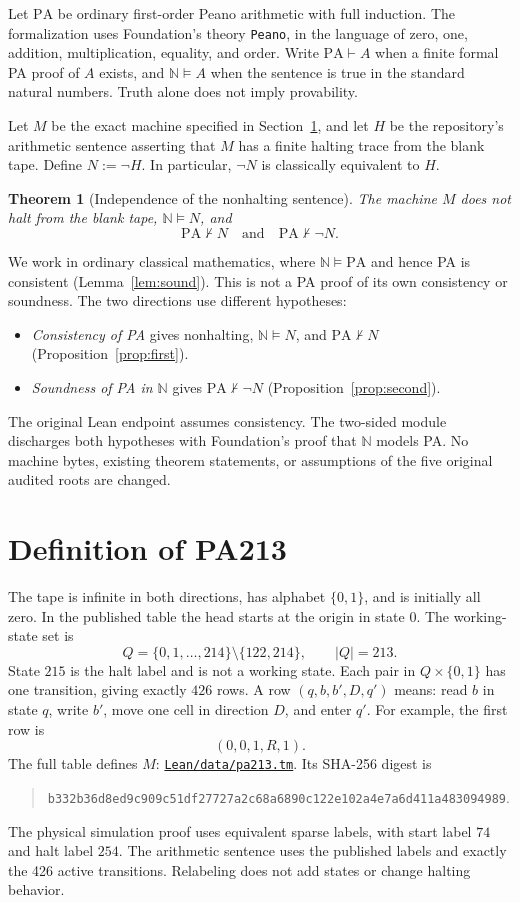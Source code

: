 \documentclass[11pt,letterpaper]{article}
\newtheorem{theorem}{Theorem}[section]
\newcommand{\PA}{\mathrm{PA}}
\newcommand{\NN}{\mathbb{N}}
\newcommand{\src}[2]{\href{https://github.com/jamesyc/BusyBeaver/blob/034d08df73b94e9f4036fc5af74b694eb73afc67/#1}{\texttt{\nolinkurl{#2}}}}
\begin{document}
Let $\PA$ be ordinary first-order Peano arithmetic with full induction.
The formalization uses Foundation's theory \texttt{Peano}, in the language
of zero, one, addition, multiplication, equality, and order.
Write $\PA\vdash A$ when a finite formal PA proof of $A$ exists, and
$\NN\models A$ when the sentence is true in the standard natural numbers.
Truth alone does not imply provability.

Let $M$ be the exact machine specified in Section~\ref{sec:machine}, and
let $H$ be the repository's arithmetic sentence asserting that $M$ has a
finite halting trace from the blank tape. Define $N:=\neg H$.
In particular, $\neg N$ is classically equivalent to $H$.

\begin{theorem}[Independence of the nonhalting sentence]\label{thm:main}
The machine $M$ does not halt from the blank tape, $\NN\models N$, and
\[
\PA\nvdash N\quad\text{and}\quad\PA\nvdash\neg N.
\]
\end{theorem}

We work in ordinary classical mathematics, where
$\NN\models\PA$ and hence PA is consistent (Lemma~\ref{lem:sound}).
This is not a PA proof of its own consistency or soundness. The two
directions use different hypotheses:
\begin{itemize}
\item \emph{Consistency of PA} gives nonhalting, $\NN\models N$, and
$\PA\nvdash N$ (Proposition~\ref{prop:first}).
\item \emph{Soundness of PA in $\NN$} gives $\PA\nvdash\neg N$
(Proposition~\ref{prop:second}).
\end{itemize}
The original Lean endpoint assumes consistency. The two-sided module
discharges both hypotheses with Foundation's proof that
$\NN$ models PA. No machine bytes, existing theorem statements, or
assumptions of the five original audited roots are changed.

\section{Definition of PA213}\label{sec:machine}

The tape is infinite in both directions, has alphabet $\{0,1\}$, and is
initially all zero. In the published table the head starts at the origin
in state $0$. The working-state set is
\[
Q=\{0,1,\ldots,214\}\setminus\{122,214\},\qquad |Q|=213.
\]
State $215$ is the halt label and is not a working state. Each pair in
$Q\times\{0,1\}$ has one transition, giving exactly $426$ rows. A row
$(q,b,b',D,q')$ means: read $b$ in state $q$, write $b'$, move one cell in
direction $D$, and enter $q'$. For example, the first row is
\[
(0,0,1,R,1).
\]
The full table defines $M$:
\src{Lean/data/pa213.tm}{Lean/data/pa213.tm}.
Its SHA-256 digest is
\begin{quote}\small
\nolinkurl{b332b36d8ed9c909c51df27727a2c68a6890c122e102a4e7a6d411a483094989}.
\end{quote}
The physical simulation proof uses equivalent sparse labels, with
start label $74$ and halt label $254$. The arithmetic sentence uses the
published labels and exactly the 426 active transitions. Relabeling does
not add states or change halting behavior.
\end{document}
